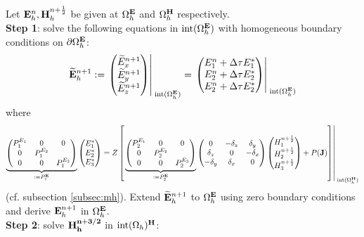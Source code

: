\documentclass[12pt,reqno]{amsart}
\newcommand{\e}{{\bf E}}
\newcommand{\h}{{\bf H}}
\theoremstyle{definition}
\numberwithin{equation}{section}
\newcommand{\intr}[1]{\mathrm{int}(#1)}
\def\Gwh{\Omega_h}
\begin{document}
	Let $\e^n_h, \h^{n+\frac{1}{2}}_h$  be given at $\Gwh^{\e}$ and $\Gwh^{\h}$ respectively. \\[2mm]
	{\bf Step 1}: solve the following equations in $\intr{\Gwh^{\e}}$ with
	 homogeneous boundary conditions on $\partial \Gwh^\e$: \\[2mm]
	$$
	\widetilde{\e}_h^{n+1}:=
	\left.
	\begin{pmatrix}
		\widetilde{E}_x^{n+1}\\
		\widetilde{E}_y^{n+1}\\
		\widetilde{E}_z^{n+1}
	\end{pmatrix}\right|_{\; \intr{\Gwh^{\e}}}^{\;}=
\left.
	\begin{pmatrix}
		E_1^n+\Delta \tau E_1^{*}\\
		E_2^n+\Delta \tau E_2^{*}\\
		E_2^n+\Delta \tau E_2^{*}
	\end{pmatrix}\right|_{\; \intr{\Gwh^{\e}}}^{\;}
	$$
	where 
	$$
	\underbrace{
	\begin{pmatrix}
		P_1^{E_1} & 0&0 \\
		0 & P_1^{E_2} &\\
		0&0&P_1^{E_3} 
	\end{pmatrix}
}_{:=P_1^\e}
	\begin{pmatrix}
		E_1^{*}\\
		E_2^{*} \\
		E_3^{*}
	\end{pmatrix}=Z
\left [ \left.
	\underbrace{
	\begin{pmatrix}
		P_2^{E_1} & 0&0 \\
		0 & P_2^{E_2} &\\
		0&0&P_2^{E_3} 
	\end{pmatrix}
}_{:=P_2^\e}
	\begin{pmatrix}
		0& -\delta_z & \delta _y\\
		\delta_z&0&-\delta_x\\
		-\delta_y&\delta_x&0
	\end{pmatrix}
	\begin{pmatrix}
		H_1^{n+\frac{1}{2}}\\
		H_2^{n+\frac{1}{2}}\\
		H_3^{n+\frac{1}{2}}
	\end{pmatrix}+P({\bf J})\right]\right|_{\; \intr{\Gwh^{\h}}}^{\;}
	$$
	(cf. subsection \ref{subsec:mh}).
	Extend $\widetilde{\e}_h^{n+1}$
to $\Gwh^\e$ using zero boundary conditions  and derive 
$\e_h^{n+1}$ in $\Gwh^\e$. 
	\\[2mm]
	{\bf Step 2}: solve $\bf{H}^{n+3/2}_h$ in $\intr\Gwh^\h$: \\[2mm]
\end{document}
